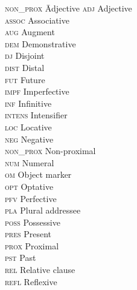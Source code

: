 \documentclass[output=paper,
            colorlinks, citecolor=brown
            ,draftmode
		  ]{langscibook}
\begin{document}
\begin{multicols}{2}
\begin{tabbing}
\textsc{non\_prox}\hspace{1ex} \= Adjective\kill
\textsc{adj}       \> Adjective\\
\textsc{assoc}     \> Associative\\
\textsc{aug}       \> Augment\\
\textsc{dem}       \> Demonstrative\\
\textsc{dj}        \> Disjoint \\
\textsc{dist}      \> Distal \\
\textsc{fut}       \> Future\\
\textsc{impf}      \> Imperfective \\
\textsc{inf}       \> Infinitive \\
\textsc{intens}    \> Intensifier \\
\textsc{loc}       \> Locative \\
\textsc{neg}       \> Negative\\
\textsc{non\_prox} \> Non-proximal \\
\textsc{num}       \> Numeral \\
\textsc{om}        \> Object marker \\
\textsc{opt}       \> Optative\\
\textsc{pfv}       \> Perfective\\
\textsc{pla}       \> Plural addressee \\
\textsc{poss}      \> Possessive \\
\textsc{pres}      \> Present \\
\textsc{prox}      \> Proximal \\
\textsc{pst}       \> Past \\
\textsc{rel}       \> Relative clause\\
\textsc{refl}      \> Reflexive
\end{tabbing}
\end{multicols}

\printbibliography[heading=subbibliography,notkeyword=this]
\end{document}
